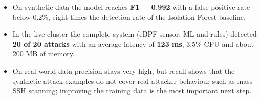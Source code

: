 \begin{itemize}
    \item On synthetic data the model reaches \textbf{F1 = 0.992} with a false-positive
          rate below 0.2\%, eight times the detection rate of the Isolation Forest
          baseline.
    \item In the live cluster the complete system (eBPF sensor, ML and rules) detected
          \textbf{20 of 20 attacks} with an average latency of \textbf{123 ms}, 3.5\% CPU
          and about 200 MB of memory.
    \item On real-world data precision stays very high, but recall shows that the
          synthetic attack examples do not cover real attacker behaviour such as mass SSH
          scanning; improving the training data is the most important next step.
\end{itemize}
